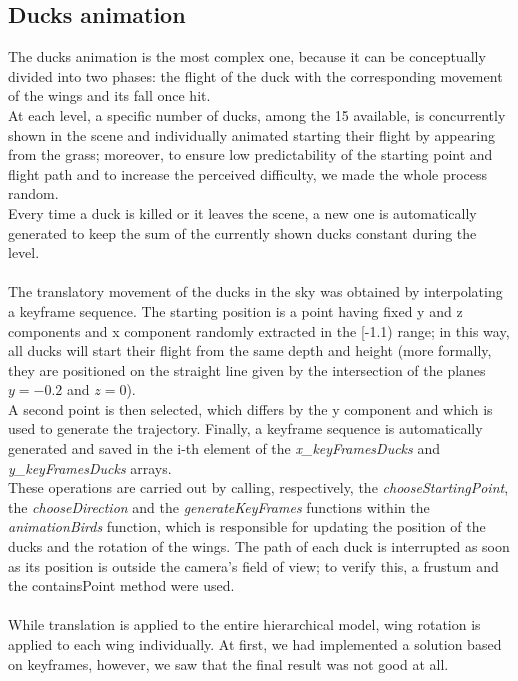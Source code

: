 \documentclass[12pt,a4paper]{article}
\begin{document}
	\subsection{Ducks animation}\label{da}
	The ducks animation is the most complex one, because it can be conceptually divided into two phases: the flight of the duck with the corresponding movement of the wings and its fall once hit.\\ 
	At each level, a specific number of ducks, among the 15 available, is concurrently shown in the scene and individually animated starting their flight by appearing from the grass; moreover, to ensure low predictability of the starting point and flight path and to increase the perceived difficulty, we made the whole process random.\\
	Every time a duck is killed or it leaves the scene, a new one is automatically generated to keep the sum of the currently shown ducks constant during the level.\\
	\\
	The translatory movement of the ducks in the sky was obtained by interpolating a keyframe sequence. 
	The starting position is a point having fixed y and z components and x component randomly extracted in the [-1.1) range; in this way, all ducks will start their flight from the same depth and height (more formally, they are positioned on the straight line given by the intersection of the planes $y=-0.2$ and $z=0$).\\
	A second point is then selected, which differs by the y component and which is used to generate the trajectory. Finally, a keyframe sequence is automatically generated and saved in the i-th element of the \textit{x\_keyFramesDucks} and \textit{y\_keyFramesDucks} arrays.\\
	These operations are carried out by calling, respectively, the \textit{chooseStartingPoint}, the \textit{chooseDirection} and the \textit{generateKeyFrames} functions within the \textit{animationBirds} function, which is responsible for updating the position of the ducks and the rotation of the wings.
	The path of each duck is interrupted as soon as its position is outside the camera's field of view; to verify this, a frustum and the containsPoint method were used.\\
	\\
	While translation is applied to the entire hierarchical model, wing rotation is applied to each wing individually. At first, we had implemented a solution based on keyframes, however, we saw that the final result was not good at all.\\
\end{document}

